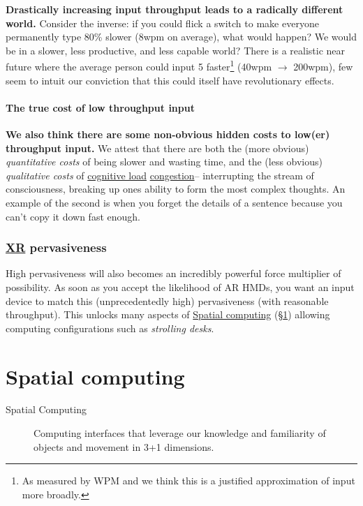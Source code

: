 \documentclass[logo,bsc,singlespacing,parskip]{infthesis}
\begin{document}
\textbf{Drastically increasing input throughput leads to a radically different world.}
Consider the inverse: if you could flick a switch to make everyone permanently type 80\% slower (8wpm on average), what would happen?
We would be in a slower, less productive, and less capable world?
There is a realistic near future where the average person could input 5\texttimes{} faster\footnote{As measured by WPM and we think this is a justified approximation of input more broadly.} (40wpm \(\rightarrow\) 200wpm), few seem to intuit our conviction that this could itself have revolutionary effects.
\paragraph{The true cost of low throughput input}
\label{sec:orgbd374d7}
\textbf{We also think there are some non-obvious hidden costs to low(er) throughput input.}
We attest that there are both the (more obvious) \emph{quantitative costs} of being slower and wasting time, and the (less obvious) \emph{qualitative costs} of \hyperref[cognitive load]{cognitive load} \hyperref[org8994918]{congestion}-- interrupting the stream of consciousness, breaking up ones ability to form the most complex thoughts.
An example of the second is when you forget the details of a sentence because you can't copy it down fast enough.

\subsubsection{\hyperref[org53dbe83]{XR} pervasiveness}
\label{sec:orgb1d0867}
High pervasiveness will also becomes an incredibly powerful force multiplier of possibility.
As soon as you accept the likelihood of AR HMDs, you want an input device to match this (unprecedentedly high) pervasiveness (with reasonable throughput).
This unlocks many aspects of \hyperref[sec:orgeda6b52]{Spatial computing} (\S \ref{sec:orgeda6b52}) allowing computing configurations such as \emph{strolling desks}.

\section{Spatial computing}
\label{sec:orgeda6b52}
\medskip
\begin{mdframed}
\begin{description}
\item[{Spatial Computing}] Computing interfaces that leverage our knowledge and familiarity of objects and movement in 3+1 dimensions.
\end{description}
\end{mdframed}
\end{document}
